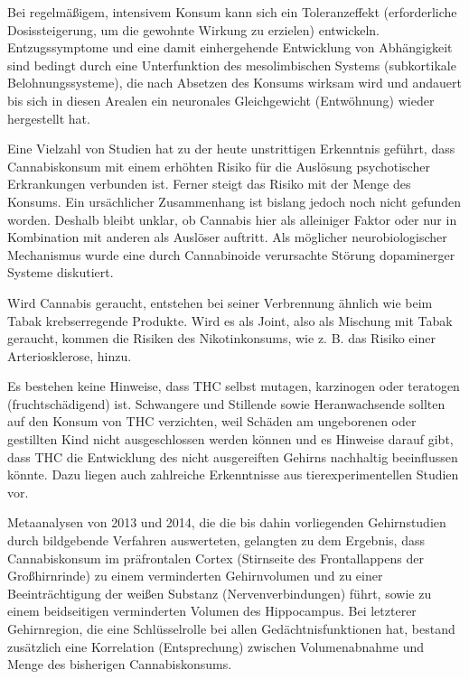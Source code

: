 \documentclass[openany]{scrbook}
\begin{document}
	Bei regelmäßigem, intensivem Konsum kann sich ein Toleranzeffekt (erforderliche Dosissteigerung, um die gewohnte Wirkung zu erzielen) entwickeln. Entzugssymptome und eine damit einhergehende Entwicklung von Abhängigkeit sind bedingt durch eine Unterfunktion des mesolimbischen Systems (subkortikale Belohnungssysteme), die nach Absetzen des Konsums wirksam wird und andauert bis sich in diesen Arealen ein neuronales Gleichgewicht (Entwöhnung) wieder hergestellt hat.
	
	Eine Vielzahl von Studien hat zu der heute unstrittigen Erkenntnis geführt, dass Cannabiskonsum mit einem erhöhten Risiko für die Auslösung psychotischer Erkrankungen verbunden ist. Ferner steigt das Risiko mit der Menge des Konsums. Ein ursächlicher Zusammenhang ist bislang jedoch noch nicht gefunden worden. Deshalb bleibt unklar, ob Cannabis hier als alleiniger Faktor oder nur in Kombination mit anderen als Auslöser auftritt. Als möglicher neurobiologischer Mechanismus wurde eine durch Cannabinoide verursachte Störung dopaminerger Systeme diskutiert.
	
	Wird Cannabis geraucht, entstehen bei seiner Verbrennung ähnlich wie beim Tabak krebserregende Produkte. Wird es als Joint, also als Mischung mit Tabak geraucht, kommen die Risiken des Nikotinkonsums, wie z. B. das Risiko einer Arteriosklerose, hinzu.
	
	Es bestehen keine Hinweise, dass THC selbst mutagen, karzinogen oder teratogen (fruchtschädigend) ist. Schwangere und Stillende sowie Heranwachsende sollten auf den Konsum von THC verzichten, weil Schäden am ungeborenen oder gestillten Kind nicht ausgeschlossen werden können und es Hinweise darauf gibt, dass THC die Entwicklung des nicht ausgereiften Gehirns nachhaltig beeinflussen könnte. Dazu liegen auch zahlreiche Erkenntnisse aus tierexperimentellen Studien vor.
	
	Metaanalysen von 2013 und 2014, die die bis dahin vorliegenden Gehirnstudien durch bildgebende Verfahren auswerteten, gelangten zu dem Ergebnis, dass Cannabiskonsum im präfrontalen Cortex (Stirnseite des Frontallappens der Großhirnrinde) zu einem verminderten Gehirnvolumen und zu einer Beeinträchtigung der weißen Substanz (Nervenverbindungen) führt, sowie zu einem beidseitigen verminderten Volumen des Hippocampus. Bei letzterer Gehirnregion, die eine Schlüsselrolle bei allen Gedächtnisfunktionen hat, bestand zusätzlich eine Korrelation (Entsprechung) zwischen Volumenabnahme und Menge des bisherigen Cannabiskonsums.
	
	

	
	
\end{document}
